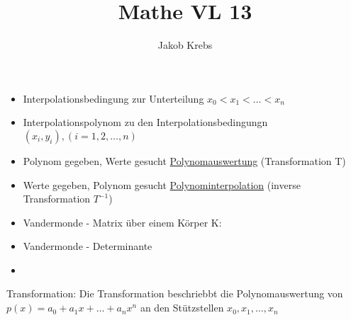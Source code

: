 \documentclass{../tudscript}
\author{Jakob Krebs}
\title{Mathe VL 13}
\begin{document}
\begin{itemize}
\item Interpolationsbedingung zur Unterteilung $ x_0 < x_1 < \ldots < x_n$
\item Interpolationspolynom zu den Interpolationsbedingungn $(x_i, y_i), (i = 1, 2, \ldots, n)$

\item Polynom gegeben, Werte gesucht \underline{Polynomauswertung} (Transformation T)
\item Werte gegeben, Polynom gesucht \underline{Polynominterpolation} (inverse Transformation $T^{-1}$)

\end{itemize}

\begin{itemize}
\item Vandermonde - Matrix über einem Körper K:
\item Vandermonde - Determinante

\item {}

\end{itemize}

Transformation:
Die Transformation beschriebbt die Polynomauswertung von $p(x) = a_0 + a_1 x + \ldots + a_n x^n$ an den Stützstellen $x_0, x_1, \ldots, x_n$

\end{document}
